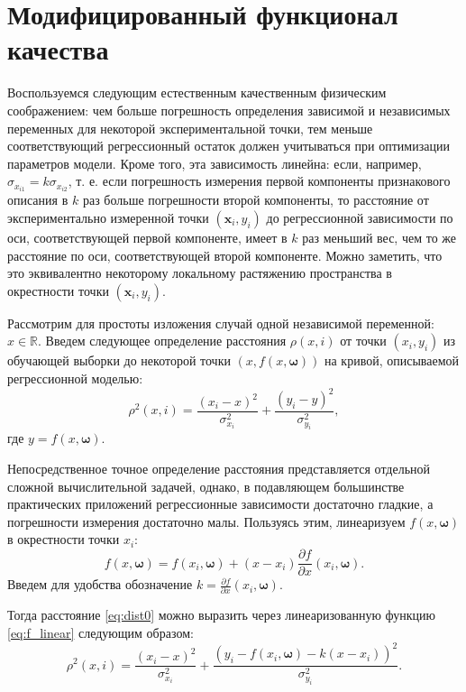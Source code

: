 \documentclass[11pt,a4paper]{article}
\newcommand{\bomega}{\boldsymbol{\omega}}
\begin{document}
\section{Модифицированный функционал качества}

Воспользуемся следующим естественным качественным физическим соображением:
чем больше погрешность определения зависимой и независимых переменных
для некоторой экспериментальной точки, тем меньше соответствующий
регрессионный остаток должен учитываться при оптимизации параметров модели.
Кроме того, эта зависимость линейна: если, например, $\sigma_{x_{i1}} = k \sigma_{x_{i2}}$,
т. е. если погрешность измерения первой компоненты признакового описания в $k$
раз больше погрешности второй компоненты, то расстояние от экспериментально
измеренной точки $(\mathbf{x}_i, y_i)$ до регрессионной зависимости по оси,
соответствующей первой компоненте, имеет в $k$ раз меньший вес, чем то же
расстояние по оси, соответствующей второй компоненте. Можно заметить, что
это эквивалентно некоторому локальному растяжению пространства в окрестности
точки $(\mathbf{x}_i, y_i)$.

Рассмотрим для простоты изложения случай одной независимой переменной:
$x \in \mathbb{R}$. Введем следующее определение расстояния $\rho(x, i)$
от точки $(x_i, y_i)$ из обучающей выборки до некоторой точки
$(x, f(x, \bomega))$ на кривой, описываемой регрессионной моделью:
\begin{equation}
  \rho^2(x, i) = \frac{(x_i - x)^2}{\sigma_{x_i}^2} + \frac{(y_i - y)^2}{\sigma_{y_i}^2},
  \label{eq:dist0}
\end{equation}
где $y = f(x, \bomega)$.

Непосредственное точное определение расстояния представляется отдельной
сложной вычислительной задачей, однако, в подавляющем большинстве
практических приложений регрессионные зависимости достаточно
гладкие, а погрешности измерения достаточно малы. Пользуясь этим,
линеаризуем $f(x, \bomega)$ в окрестности точки $x_i$:
\begin{equation}
  f(x, \bomega) = f(x_i, \bomega) + (x - x_i) \frac{\partial f}{\partial x}(x_i, \bomega).
  \label{eq:f_linear}
\end{equation}
Введем для удобства обозначение $k = \frac{\partial f}{\partial x}(x_i, \bomega)$.

Тогда расстояние \eqref{eq:dist0} можно выразить через линеаризованную функцию
\eqref{eq:f_linear} следующим образом:
\begin{equation}
  \rho^2(x, i) = \frac{(x_i - x)^2}{\sigma_{x_i}^2} + \frac{(y_i - f(x_i, \bomega) - k (x - x_i))^2}{\sigma_{y_i}^2}.
  \label{eq:dist_linear}
\end{equation}
\end{document}
